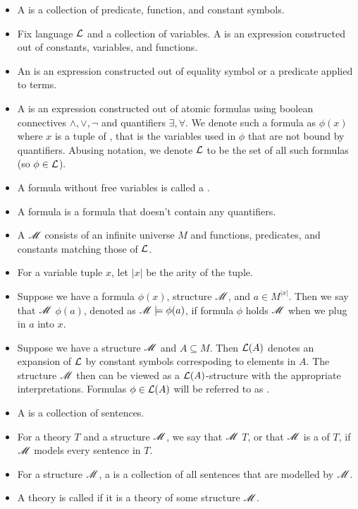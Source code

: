 \begin{Definition}
  \begin{itemize}
  \item A  is a collection of predicate, function, and constant symbols.
  \item Fix language $\mathcal L$ and a collection of variables.
    A  is an expression constructed out of constants, variables, and functions.
  \item An  is an expression constructed out of equality symbol or a predicate applied to terms.
  \item A  is an expression constructed out of atomic formulas using boolean connectives
    $\wedge, \vee, \neg$ and quantifiers $\exists, \forall$.
    We denote such a formula as $\phi(x)$ where $x$ is a tuple of ,
    that is the variables used in $\phi$ that are not bound by quantifiers.
    Abusing notation, we denote $\mathcal L$ to be the set of all such formulas (so $\phi \in \mathcal L$).
  \item A formula without free variables is called a .
  \item A  formula is a formula that doesn't contain any quantifiers.
  \item A  $\mathscr M$ consists of an infinite universe $M$ and functions, predicates, and constants matching those of $\mathcal L$.
  \item For a variable tuple $x$, let $|x|$ be the arity of the tuple.
  \item Suppose we have a formula $\phi(x)$, structure $\mathscr M$, and $a \in M^{|x|}$.
    Then we say that $\mathscr M$  $\phi(a)$, denoted as $\mathscr M \models \phi(a)$,
    if formula $\phi$ holds $\mathscr M$ when we plug in $a$ into $x$.
  \item Suppose we have a structure $\mathscr M$ and $A \subseteq M$.
    Then $\mathcal L(A)$ denotes an expansion of $\mathcal L$ by constant symbols correspoding to elements in $A$.
    The structure $\mathscr M$ then can be viewed as a $\mathcal L(A)$-structure with the appropriate interpretations.
    Formulas $\phi \in \mathcal L(A)$ will be referred to as .
  \item A  is a collection of sentences.
  \item For a theory $T$ and a structure $\mathscr M$, we say that $\mathscr M$  $T$,
    or that $\mathscr M$ is a  of $T$, if $\mathscr M$ models every sentence in $T$.
  \item For a structure $\mathscr M$, a  is a collection of all sentences that are modelled by $\mathscr M$.
  \item A theory is called  if it is a theory of some structure $\mathscr M$.
  \end{itemize}  
\end{Definition}

